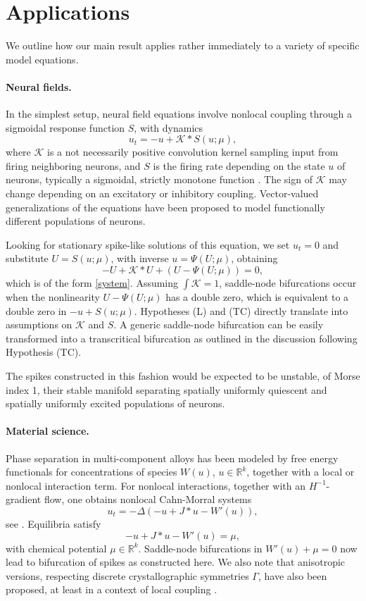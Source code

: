 \documentclass[10pt]{article}
\newcommand{\R}{\mathbb{R}}
\newcommand{\K}{\mathcal{K}}
\begin{document}
\section{Applications}\label{s:app}

We outline how our main result applies rather immediately to a variety of specific model equations. 

\paragraph{Neural fields.}

In the simplest setup, neural field equations involve nonlocal coupling through a sigmoidal response function $S$, with dynamics 
\[
u_t=-u+\K*S(u;\mu),
\]
where $\K$ is a not necessarily positive convolution kernel sampling input from firing neighboring neurons, and $S$ is the firing rate depending on the state $u$ of neurons, typically a sigmoidal, strictly monotone function \cite{neuralfieldrev}. The sign of $\K$ may change depending on an excitatory or inhibitory coupling. Vector-valued generalizations of the equations have been proposed to model functionally different populations of neurons. 

Looking for stationary spike-like solutions of this equation, we set $u_t=0$ and substitute $U=S(u;\mu)$, with inverse $u=\Psi(U;\mu)$, obtaining
\[
-U+\K*U+(U-\Psi(U;\mu))=0,
\]
which is of the form \eqref{system}. Assuming $\int\K=1$, saddle-node bifurcations occur when the nonlinearity $U-\Psi(U;\mu)$ has a double zero, which is equivalent to a double zero in $-u+S(u;\mu)$. Hypotheses (L) and (TC) directly translate into assumptions on $\K$ and $S$. A generic saddle-node bifurcation can be easily transformed into a transcritical bifurcation as outlined in the discussion following Hypothesis (TC). 

The spikes constructed in this fashion would be expected to be unstable, of Morse index 1, their stable manifold separating spatially uniformly quiescent and spatially uniformly excited populations of neurons. 

\paragraph{Material science.} Phase separation in multi-component alloys has been modeled by free energy functionals for concentrations of species $W(u)$, $u\in \R^k$, together with a local or nonlocal interaction term. For nonlocal interactions, together with an $H^{-1}$-gradient flow, one obtains nonlocal Cahn-Morral systems
\[
u_t=-\Delta(-u+J*u-W'(u)),
\]
see \cite{cahn-morral}. Equilibria satisfy 
\[
-u+J*u-W'(u)=\mu,
\]
with chemical potential $\mu\in\R^k$. Saddle-node bifurcations in $W'(u)+\mu=0$ now lead to bifurcation of spikes as constructed here. We also note that anisotropic versions, respecting discrete crystallographic symmetries $\Gamma$, have also been proposed, at least in a context of local coupling \cite{anisoCH}. 
\end{document}
